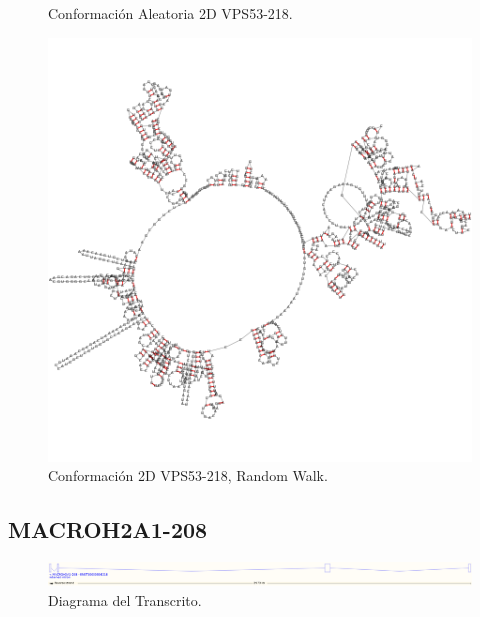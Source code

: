 \documentclass[a4paper,11pt,titlepage]{article}
\theoremstyle{definition}
\begin{document}
\begin{figure}[H]
\begin{minipage}[c]{0.31\textwidth}
        \caption{Conformación Aleatoria 2D VPS53-218.}
        \label{fig:VPS53-218-rndc}
    \end{minipage}
    \hfill
    \begin{minipage}[c]{0.31\textwidth}
        \centering
        \includegraphics[width=\textwidth]{images/VPS53-218-db_one_conf.png}
        \caption{Conformación 2D VPS53-218, Random Walk.}
        \label{fig:VPS53-218-rndw}
    \end{minipage}
\end{figure}

\newpage
\subsection*{MACROH2A1-208}\label{subsec:gene4}

\begin{figure}[H]
    \centering
    \includegraphics[width=\textwidth]{images/MACROH2A1-208.png}
    \caption{Diagrama del Transcrito.}
    \label{fig:MACROH2A1-208-diag}
\end{figure}
\end{document}
